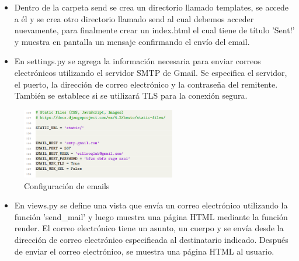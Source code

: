 \documentclass{article}
\begin{document}
        \begin{itemize}	
            \item Dentro de la carpeta send se crea un directorio llamado templates, se accede a él y se crea otro directorio llamado send al cual debemos acceder nuevamente, para finalmente crear un index.html el cual tiene de título 'Sent!' y muestra en pantalla un mensaje confirmando el envío del email.
        \end{itemize}
         
        \begin{itemize}	
            \item En settings.py se agrega la información necesaria para enviar correos electrónicos utilizando el servidor SMTP de Gmail. Se especifica el servidor, el puerto, la dirección de correo electrónico y la contraseña del remitente. También se establece si se utilizará TLS para la conexión segura.
        \end{itemize}
        \begin{figure}[H]
        \centering
        \includegraphics[width=0.6\textwidth]{img/settings.png}
        \caption*{Configuración de emails}
        \end{figure}
        \begin{itemize}	
            \item En views.py se define una vista que envía un correo electrónico utilizando la función 'send\_mail' y luego muestra una página HTML mediante la función render. El correo electrónico tiene un asunto, un cuerpo y se envía desde la dirección de correo electrónico especificada al destinatario indicado. Después de enviar el correo electrónico, se muestra una página HTML al usuario.
        \end{itemize}
         
\end{document}
